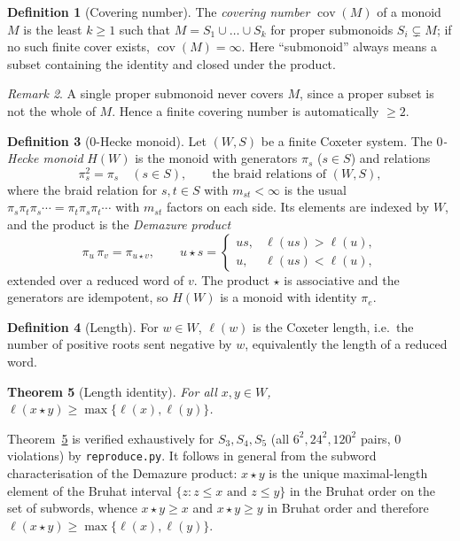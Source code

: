 \documentclass[11pt]{article}
\newtheorem{theorem}{Theorem}
\theoremstyle{definition}
\newtheorem{definition}[theorem]{Definition}
\theoremstyle{remark}
\newtheorem{remark}[theorem]{Remark}
\newcommand{\St}{\star}
\newcommand{\cov}{\operatorname{cov}}
\DeclareMathOperator{\len}{\ell}
\begin{document}
\begin{definition}[Covering number]
The \emph{covering number} $\cov(M)$ of a monoid $M$ is the least $k\ge 1$ such
that $M=S_1\cup\dots\cup S_k$ for proper submonoids $S_i\subsetneq M$; if no
such finite cover exists, $\cov(M)=\infty$. Here ``submonoid'' always means a
subset containing the identity and closed under the product.
\end{definition}

\begin{remark}\label{rem:oneproper}
A single proper submonoid never covers $M$, since a proper subset is not the
whole of $M$. Hence a finite covering number is automatically $\ge 2$.
\end{remark}

\begin{definition}[$0$-Hecke monoid]
Let $(W,S)$ be a finite Coxeter system. The \emph{$0$-Hecke monoid} $H(W)$ is
the monoid with generators $\pi_s$ ($s\in S$) and relations
\[
\pi_s^2=\pi_s \quad (s\in S),
\qquad
\text{the braid relations of }(W,S),
\]
where the braid relation for $s,t\in S$ with $m_{st}<\infty$ is the usual
$\pi_s\pi_t\pi_s\cdots=\pi_t\pi_s\pi_t\cdots$ with $m_{st}$ factors on each
side. Its elements are indexed by $W$, and the product is the \emph{Demazure
product}
\[
\pi_u\,\pi_v=\pi_{u\St v},
\qquad
u\St s=
\begin{cases}
us, & \len(us)>\len(u),\\ u, & \len(us)<\len(u),
\end{cases}
\]
extended over a reduced word of $v$. The product $\St$ is associative and the
generators are idempotent, so $H(W)$ is a monoid with identity $\pi_e$.
\end{definition}

\begin{definition}[Length]
For $w\in W$, $\len(w)$ is the Coxeter length, i.e.\ the number of positive
roots sent negative by $w$, equivalently the length of a reduced word.

\end{definition}

\begin{theorem}[Length identity]\label{thm:length}
For all $x,y\in W$, $\len(x\St y)\ge\max\{\len(x),\len(y)\}$.
\end{theorem}

Theorem~\ref{thm:length} is verified exhaustively for $S_3,S_4,S_5$ (all
$6^2,24^2,120^2$ pairs, $0$ violations) by \texttt{reproduce.py}. It follows in
general from the subword characterisation of the Demazure product: $x\St y$ is
the unique maximal-length element of the Bruhat interval
$\{z: z\le x \text{ and } z\le y\}$ in the Bruhat order on the set of
subwords, whence $x\St y\ge x$ and $x\St y\ge y$ in Bruhat order and therefore
$\len(x\St y)\ge\max\{\len(x),\len(y)\}$.
\end{document}
